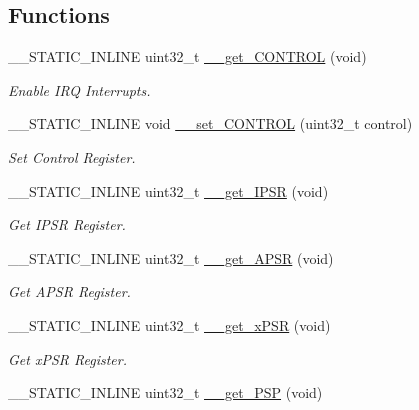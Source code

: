 \subsection*{Functions}
\begin{DoxyCompactItemize}
\item 
\+\_\+\+\_\+\+S\+T\+A\+T\+I\+C\+\_\+\+I\+N\+L\+I\+NE uint32\+\_\+t \mbox{\hyperlink{group___c_m_s_i_s___core___reg_acc_functions_ga7dd5c942bee32f055b90153feb950f59}{\+\_\+\+\_\+get\+\_\+\+C\+O\+N\+T\+R\+OL}} (void)
\begin{DoxyCompactList}\small\item\em Enable I\+RQ Interrupts. \end{DoxyCompactList}\item 
\+\_\+\+\_\+\+S\+T\+A\+T\+I\+C\+\_\+\+I\+N\+L\+I\+NE void \mbox{\hyperlink{group___c_m_s_i_s___core___reg_acc_functions_ga0102d0939d9b26c5c792be6bf5fd550f}{\+\_\+\+\_\+set\+\_\+\+C\+O\+N\+T\+R\+OL}} (uint32\+\_\+t control)
\begin{DoxyCompactList}\small\item\em Set Control Register. \end{DoxyCompactList}\item 
\+\_\+\+\_\+\+S\+T\+A\+T\+I\+C\+\_\+\+I\+N\+L\+I\+NE uint32\+\_\+t \mbox{\hyperlink{group___c_m_s_i_s___core___reg_acc_functions_gaf15a71855b9d731d11de92704c82bd18}{\+\_\+\+\_\+get\+\_\+\+I\+P\+SR}} (void)
\begin{DoxyCompactList}\small\item\em Get I\+P\+SR Register. \end{DoxyCompactList}\item 
\+\_\+\+\_\+\+S\+T\+A\+T\+I\+C\+\_\+\+I\+N\+L\+I\+NE uint32\+\_\+t \mbox{\hyperlink{group___c_m_s_i_s___core___reg_acc_functions_gadff4f1e599946e8ae96fba17b5245f04}{\+\_\+\+\_\+get\+\_\+\+A\+P\+SR}} (void)
\begin{DoxyCompactList}\small\item\em Get A\+P\+SR Register. \end{DoxyCompactList}\item 
\+\_\+\+\_\+\+S\+T\+A\+T\+I\+C\+\_\+\+I\+N\+L\+I\+NE uint32\+\_\+t \mbox{\hyperlink{group___c_m_s_i_s___core___reg_acc_functions_ga52ca795dc9429ee0ac64ddd12c034834}{\+\_\+\+\_\+get\+\_\+x\+P\+SR}} (void)
\begin{DoxyCompactList}\small\item\em Get x\+P\+SR Register. \end{DoxyCompactList}\item 
\+\_\+\+\_\+\+S\+T\+A\+T\+I\+C\+\_\+\+I\+N\+L\+I\+NE uint32\+\_\+t \mbox{\hyperlink{group___c_m_s_i_s___core___reg_acc_functions_ga826c53e30812e350c77f58aac9f42bcb}{\+\_\+\+\_\+get\+\_\+\+P\+SP}} (void)

\end{DoxyCompactItemize}
